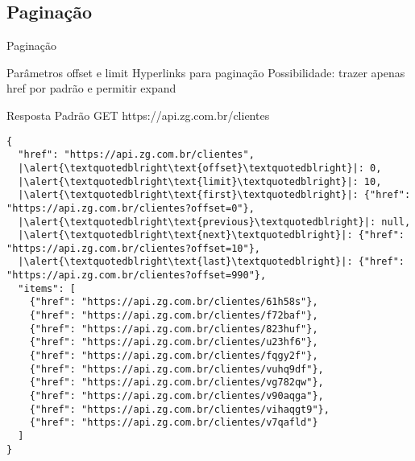 \documentclass{beamer}
\begin{document}
\subsection{Paginação}

\begin{frame}{Paginação}
  \begin{outline}
     Parâmetros \alert{offset} e \alert{limit}
     Hyperlinks para paginação
     Possibilidade: trazer apenas \alert{href} por padrão e permitir \alert{expand}
  \end{outline}
\end{frame}

\begin{frame}[fragile]{Resposta Padrão}
  GET https://api.zg.com.br/clientes
  \begin{verbatim}
{
  "href": "https://api.zg.com.br/clientes",
  |\alert{\textquotedblright\text{offset}\textquotedblright}|: 0,
  |\alert{\textquotedblright\text{limit}\textquotedblright}|: 10,
  |\alert{\textquotedblright\text{first}\textquotedblright}|: {"href": "https://api.zg.com.br/clientes?offset=0"},
  |\alert{\textquotedblright\text{previous}\textquotedblright}|: null,
  |\alert{\textquotedblright\text{next}\textquotedblright}|: {"href": "https://api.zg.com.br/clientes?offset=10"},
  |\alert{\textquotedblright\text{last}\textquotedblright}|: {"href": "https://api.zg.com.br/clientes?offset=990"},
  "items": [
    {"href": "https://api.zg.com.br/clientes/61h58s"},
    {"href": "https://api.zg.com.br/clientes/f72baf"},
    {"href": "https://api.zg.com.br/clientes/823huf"},
    {"href": "https://api.zg.com.br/clientes/u23hf6"},
    {"href": "https://api.zg.com.br/clientes/fqgy2f"},
    {"href": "https://api.zg.com.br/clientes/vuhq9df"},
    {"href": "https://api.zg.com.br/clientes/vg782qw"},
    {"href": "https://api.zg.com.br/clientes/v90aqga"},
    {"href": "https://api.zg.com.br/clientes/vihaqgt9"},
    {"href": "https://api.zg.com.br/clientes/v7qafld"}
  ]
}
  \end{verbatim}
\end{frame}
\end{document}
